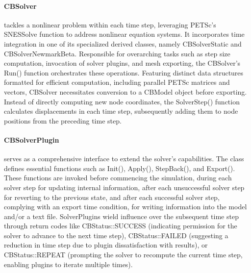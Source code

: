 \paragraph{CBSolver} tackles a nonlinear problem within each time step, leveraging PETSc's SNESSolve function to address nonlinear equation systems. 
It incorporates time integration in one of its specialized derived classes, namely CBSolverStatic and CBSolverNewmarkBeta. 
Responsible for overarching tasks such as step size computation, invocation of solver plugins, and mesh exporting, the CBSolver's Run() function orchestrates these operations. 
Featuring distinct data structures formatted for efficient computation, including parallel PETSc matrices and vectors, CBSolver necessitates conversion to a CBModel object before exporting. 
Instead of directly computing new node coordinates, the SolverStep() function calculates displacements in each time step, subsequently adding them to node positions from the preceding time step.

\paragraph{CBSolverPlugin} serves as a comprehensive interface to extend the solver's capabilities. 
The class defines essential functions such as Init(), Apply(), StepBack(), and Export(). 
These functions are invoked before commencing the simulation, during each solver step for updating internal information, after each unsuccessful solver step for reverting to the previous state, and after each successful solver step, complying with an export time condition, for writing information into the model and/or a text file. 
SolverPlugins wield influence over the subsequent time step through return codes like CBStatus::SUCCESS (indicating permission for the solver to advance to the next time step), CBStatus::FAILED (suggesting a reduction in time step due to plugin dissatisfaction with results), or CBStatus::REPEAT (prompting the solver to recompute the current time step, enabling plugins to iterate multiple times).

